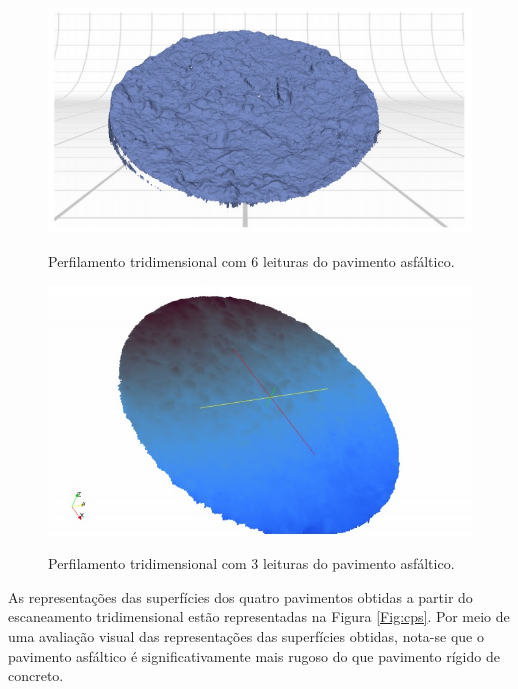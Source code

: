 \begin{figure}[!ht]
\centering
{\includegraphics[scale=0.83]{figures/6leituras.jpg}}\\
\caption{Perfilamento tridimensional com 6 leituras do pavimento asfáltico.}
\label{Fig:6leituras}
\end{figure}

\begin{figure}[!ht]
\centering
{\includegraphics[scale=0.83]{figures/3leituras.jpg}}\\
\caption{Perfilamento tridimensional com 3 leituras do pavimento asfáltico.}
\label{Fig:3leituras}
\end{figure}

As representações das superfícies dos quatro pavimentos obtidas a partir do escaneamento tridimensional estão representadas na Figura \ref{Fig:cps}. Por meio de uma avaliação visual das representações das superfícies obtidas, nota-se que o pavimento asfáltico é significativamente mais rugoso do que pavimento rígido de concreto.

